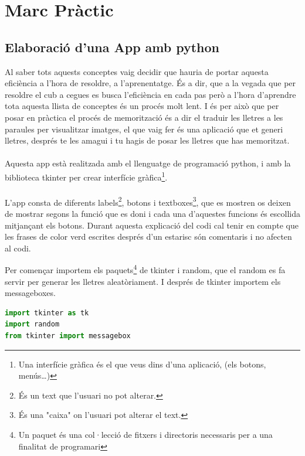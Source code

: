 \section{Marc Pràctic}

\subsection{Elaboració d'una App amb python}

Al saber tots aquests conceptes vaig decidir que hauria de portar aquesta eficiència a l'hora de resoldre, a l'aprenentatge. És a dir, que a la vegada que per resoldre el cub a cegues es busca l'eficiència en cada pas però a l'hora d'aprendre tota aquesta llista de conceptes és un procés molt lent.
I és per això que per posar en pràctica el procés de memorització és a dir el traduir les lletres a les paraules per visualitzar imatges, el que vaig fer és una aplicació que et generi lletres, després te les amagui i tu hagis de posar les lletres que has memoritzat.
\\\\Aquesta app està realitzada amb el llenguatge de programació python, i amb la biblioteca tkinter per crear interfície gràfica\footnote{Una interfície gràfica és el que veus dins d'una aplicació, (els botons, menús\dots)}.
\\\\L'app consta de diferents labels\footnote{És un text que l'usuari no pot alterar.}, botons i textboxes\footnote{És una "caixa" on l'usuari pot alterar el text.}, que es mostren os deixen de mostrar segons la funció que es doni i cada una d'aquestes funcions és escollida mitjançant els botons. Durant aquesta explicació del codi cal tenir en compte que les frases de color verd escrites després d'un estarisc són comentaris i no afecten al codi.

\vspace{0.5cm}

Per començar importem els paquets\footnote{Un paquet és una col·lecció de fitxers i directoris necessaris per a una finalitat de programari} de tkinter i random, que el random es fa servir per generar les lletres aleatòriament. I després de tkinter importem els messageboxes.

\begin{lstlisting}[language=Python, style=colorEX, caption=Importació de paquets]
import tkinter as tk
import random
from tkinter import messagebox
\end{lstlisting}


